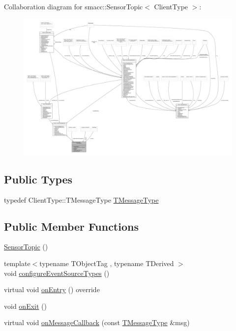 Collaboration diagram for smacc\+:\+:Sensor\+Topic$<$ Client\+Type $>$\+:
\nopagebreak
\begin{figure}[H]
\begin{center}
\leavevmode
\includegraphics[width=350pt]{classsmacc_1_1SensorTopic__coll__graph}
\end{center}
\end{figure}
\subsection*{Public Types}
\begin{DoxyCompactItemize}
\item 
typedef Client\+Type\+::\+T\+Message\+Type \hyperlink{classsmacc_1_1SensorTopic_a8c57644ed5865162ef19fd5a290d2730}{T\+Message\+Type}
\end{DoxyCompactItemize}
\subsection*{Public Member Functions}
\begin{DoxyCompactItemize}
\item 
\hyperlink{classsmacc_1_1SensorTopic_a3c11e8c6e738cea40c8172b033533bab}{Sensor\+Topic} ()
\item 
{\footnotesize template$<$typename T\+Object\+Tag , typename T\+Derived $>$ }\\void \hyperlink{classsmacc_1_1SensorTopic_a642f1ced7db66cd92a2ec43e128b4fd1}{configure\+Event\+Source\+Types} ()
\item 
virtual void \hyperlink{classsmacc_1_1SensorTopic_aa18961f866b7427973acb2660c8e39ee}{on\+Entry} () override
\item 
void \hyperlink{classsmacc_1_1SensorTopic_a3d667ad8340bd04a8a6b84eccfebe3f0}{on\+Exit} ()
\item 
virtual void \hyperlink{classsmacc_1_1SensorTopic_ab28b08e1dc643d880ce016f41c60b7b6}{on\+Message\+Callback} (const \hyperlink{classsmacc_1_1SensorTopic_a8c57644ed5865162ef19fd5a290d2730}{T\+Message\+Type} \&msg)
\end{DoxyCompactItemize}
